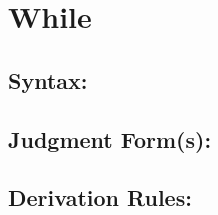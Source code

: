 \documentclass[11pt]{jarticle}
\begin{document}
\EvalRefMLiiiDisplayRules

\newpage
\section*{While}



\subsection*{Syntax:}
\WhileDisplayBNF

\subsection*{Judgment Form(s):}


\subsection*{Derivation Rules:}
\WhileDisplayRules

\end{document}
